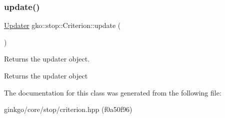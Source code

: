 \subsubsection{\texorpdfstring{update()}{update()}}
{\footnotesize\ttfamily \hyperlink{classgko_1_1stop_1_1Criterion_1_1Updater}{Updater} gko\+::stop\+::\+Criterion\+::update (\begin{DoxyParamCaption}{ }\end{DoxyParamCaption})\hspace{0.3cm}{\ttfamily [inline]}}



Returns the updater object. 

\begin{DoxyReturn}{Returns}
the updater object 
\end{DoxyReturn}


The documentation for this class was generated from the following file\+:\begin{DoxyCompactItemize}
\item 
ginkgo/core/stop/criterion.\+hpp (f0a50f96)\end{DoxyCompactItemize}
